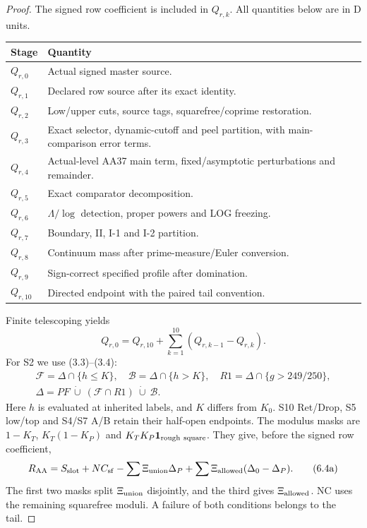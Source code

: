 \begin{proof}
The signed row coefficient is included in $Q_{r,k}$.
All quantities below are in D units.
\begin{longtable}{@{}p{}p{}@{}}
\toprule
Stage & Quantity \\\midrule
$Q_{r,0}$ & Actual signed master source. \\
$Q_{r,1}$ & Declared row source after its exact identity. \\
$Q_{r,2}$ & Low/upper cuts, source tags, squarefree/coprime restoration. \\
$Q_{r,3}$ & Exact selector, dynamic-cutoff and peel partition, with main-comparison error terms. \\
$Q_{r,4}$ & Actual-level AA37 main term, fixed/asymptotic perturbations and remainder. \\
$Q_{r,5}$ & Exact comparator decomposition. \\
$Q_{r,6}$ & $\Lambda/\log$ detection, proper powers and LOG freezing. \\
$Q_{r,7}$ & Boundary, II, I-1 and I-2 partition. \\
$Q_{r,8}$ & Continuum mass after prime-measure/Euler conversion. \\
$Q_{r,9}$ & Sign-correct specified profile after domination. \\
$Q_{r,10}$ & Directed endpoint with the paired tail convention. \\
\bottomrule
\end{longtable}
Finite telescoping yields
\[
Q_{r,0}=Q_{r,10}+\sum_{k=1}^{10}(Q_{r,k-1}-Q_{r,k}).\tag{6.4}
\]
For S2 we use (3.3)--(3.4):
\[
\begin{gathered}
\mathcal F=\Delta\cap\{h\le K\},\quad
\mathcal B=\Delta\cap\{h>K\},\quad R1=\Delta\cap\{g>249/250\},\\
\Delta=PF\ \dot\cup\ (\mathcal F\cap R1)\ \dot\cup\ \mathcal B.
\end{gathered}
\]
Here $h$ is evaluated at inherited labels, and $K$ differs from $K_0$.
S10 Ret/Drop, S5 low/top and S4/S7 A/B retain their half-open endpoints.
The modulus masks are $1-K_T$, $K_T(1-K_P)$ and
$K_TK_P\mathbf1_{\rm rough\ square}$.
They give, before the signed row coefficient,
\[
R_{\rm AA}=S_{\rm slot}+NC_{\rm sf}
-\sum\Xi_{\rm union}\Delta_P
+\sum\Xi_{\rm allowed}(\Delta_0-\Delta_P).\tag{6.4a}
\]
The first two masks split $\Xi_{\rm union}$ disjointly,
and the third gives $\Xi_{\rm allowed}$.
NC uses the remaining squarefree moduli.
A failure of both conditions belongs to the tail.


\end{proof}
